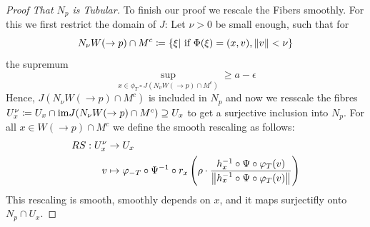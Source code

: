 \begin{proof}[Proof That $N_p$ is Tubular]
	To finish our proof we rescale the Fibers smoothly. For this we first restrict the domain of $J$: Let $\nu>0$ be small enough, such that for 
	\begin{equation*}
		N_{\nu}W(\to p)\cap M^c\coloneq \{\xi|\text{ if }\Phi(\xi)=(x,v), \left\lVert v\right\rVert<\nu\}
	\end{equation*} the supremum
	\begin{equation*}
		\sup\limits_{x \in \phi_T\circ J \left( N_{\nu}W(\to p)\cap M^c \right)}\geq a-\epsilon
	\end{equation*} Hence, $J( N_{\nu}W(\to p)\cap M^c)$ is included in $N_p$ and now we resscale the fibres $U_x^{\nu}\coloneq  U_x\cap \mathrm{im} J( N_{\nu}W(\to p)\cap M^c)\supseteq U_x$ to get a surjective inclusion into $N_p$. 
	For all $x\in W(\to p)\cap M^c$ we define the smooth rescaling as follows: 
	\begin{align*}
		RS: U_x^{\nu} &\to U_x\\
		v &\mapsto \varphi_{-T}\circ \Psi^{-1} \circ r_x \left(\rho \cdot \frac{h_x^{-1}\circ \Psi \circ\varphi_T(v)}{\left\lVert h_x^{-1}\circ \Psi \circ\varphi_T(v)\right\rVert} \right)
	\end{align*} This rescaling is smooth, smoothly depends on $x$, and it maps surjectifly onto $N_p\cap U_x$. 
\end{proof}